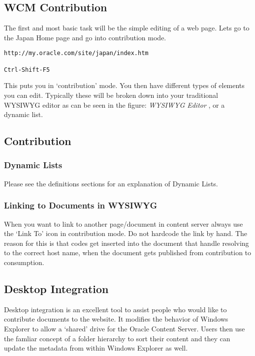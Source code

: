 \subsection{WCM Contribution}

The first and most basic task will be the simple editing of a web
page.  Lets go to the Japan Home page and go into contribution mode.

\begin{verbatim}
http://my.oracle.com/site/japan/index.htm

Ctrl-Shift-F5
\end{verbatim}

This puts you in `contribution' mode.  You then have different types
of elements you can edit.  Typically these will be broken down into
your traditional WYSIWYG editor as can be seen in the figure: \emph{WYSIWYG Editor
}, or a dynamic list.

\subsection{Contribution}

\subsubsection{Dynamic Lists}

Please see the definitions sections for an explanation of Dynamic Lists.

\subsubsection{Linking to Documents in WYSIWYG}

When you want to link to another page/document in content server
always use the `Link To' icon in contribution mode.  Do not hardcode
the link by hand.  The reason for this is that codes get inserted into
the document that handle resolving to the correct host name, when the
document gets published from contribution to consumption.

\subsection{Desktop Integration}

Desktop integration is an excellent tool to assist people who would
like to contribute documents to the website.  It modifies the behavior
of Windows Explorer to allow a `shared' drive for the Oracle Content
Server.  Users then use the famliar concept of a folder hierarchy to
sort their content and they can update the metadata from within
Windows Explorer as well.

